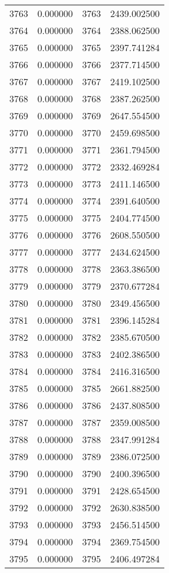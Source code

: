 \documentclass[12pt]{article}
\begin{document}
\begin{longtable}{@{}cccc@{}}
3763 & 0.000000 & 3763 & 2439.002500 \\
3764 & 0.000000 & 3764 & 2388.062500 \\
3765 & 0.000000 & 3765 & 2397.741284 \\
3766 & 0.000000 & 3766 & 2377.714500 \\
3767 & 0.000000 & 3767 & 2419.102500 \\
3768 & 0.000000 & 3768 & 2387.262500 \\
3769 & 0.000000 & 3769 & 2647.554500 \\
3770 & 0.000000 & 3770 & 2459.698500 \\
3771 & 0.000000 & 3771 & 2361.794500 \\
3772 & 0.000000 & 3772 & 2332.469284 \\
3773 & 0.000000 & 3773 & 2411.146500 \\
3774 & 0.000000 & 3774 & 2391.640500 \\
3775 & 0.000000 & 3775 & 2404.774500 \\
3776 & 0.000000 & 3776 & 2608.550500 \\
3777 & 0.000000 & 3777 & 2434.624500 \\
3778 & 0.000000 & 3778 & 2363.386500 \\
3779 & 0.000000 & 3779 & 2370.677284 \\
3780 & 0.000000 & 3780 & 2349.456500 \\
3781 & 0.000000 & 3781 & 2396.145284 \\
3782 & 0.000000 & 3782 & 2385.670500 \\
3783 & 0.000000 & 3783 & 2402.386500 \\
3784 & 0.000000 & 3784 & 2416.316500 \\
3785 & 0.000000 & 3785 & 2661.882500 \\
3786 & 0.000000 & 3786 & 2437.808500 \\
3787 & 0.000000 & 3787 & 2359.008500 \\
3788 & 0.000000 & 3788 & 2347.991284 \\
3789 & 0.000000 & 3789 & 2386.072500 \\
3790 & 0.000000 & 3790 & 2400.396500 \\
3791 & 0.000000 & 3791 & 2428.654500 \\
3792 & 0.000000 & 3792 & 2630.838500 \\
3793 & 0.000000 & 3793 & 2456.514500 \\
3794 & 0.000000 & 3794 & 2369.754500 \\
3795 & 0.000000 & 3795 & 2406.497284 \\

\end{longtable}
\end{document}
